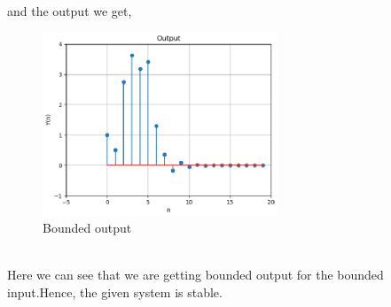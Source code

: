 \documentclass[journal,12pt,twocolumn]{IEEEtran}
\begin{document}
and the output we get,\\
\begin{figure}[h!]
    \centering
    \includegraphics[width=7cm]{./figures/Figure_2.eps}
    \caption{Bounded output}
    \label{yn}
\end{figure} \\
Here we can see that we are getting bounded output for the bounded input.Hence, the given system is stable.\\
\end{document}
